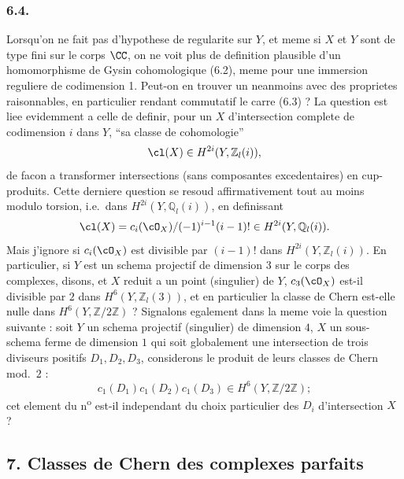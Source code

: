 \subsubsection*{6.4.}
Lorsqu'on ne fait pas d'hypothese de regularite sur $Y$, et meme si $X$ et $Y$ sont de type fini sur le corps $\CC$, on ne voit plus de definition plausible d'un homomorphisme de Gysin cohomologique (6.2), meme pour une immersion reguliere de codimension 1. Peut-on en trouver un neanmoins avec des proprietes raisonnables, en particulier rendant commutatif le carre (6.3) ? La question est liee evidemment a celle de definir, pour un $X$ d'intersection complete de codimension $i$ dans $Y$, ``sa classe de cohomologie''
\[
\cl(X) \in H^{2i}(Y, \mathbb{Z}_l(i)),
\]
de facon a transformer intersections (sans composantes excedentaires) en cup-produits. Cette derniere question se resoud affirmativement tout au moins modulo torsion, i.e.\ dans $H^{2i}(Y, \mathbb{Q}_l(i))$, en definissant
\[
\cl(X) = c_i(\cO_X) / (-1)^{i-1}(i-1)! \in H^{2i}(Y, \mathbb{Q}_l(i)).
\]
Mais j'ignore si $c_i(\cO_X)$ est divisible par $(i-1)!$ dans $H^{2i}(Y, \mathbb{Z}_l(i))$. En particulier, si $Y$ est un schema projectif de dimension $3$ sur le corps des complexes, disons, et $X$ reduit a un point (singulier) de $Y$, $c_3(\cO_X)$ est-il divisible par $2$ dans $H^{6}(Y, \mathbb{Z}_l(3))$, et en particulier la classe de Chern est-elle nulle dans $H^{6}(Y, \mathbb{Z}/2\mathbb{Z})$ ? Signalons egalement dans la meme voie la question suivante : soit $Y$ un schema projectif (singulier) de dimension $4$, $X$ un sous-schema ferme de dimension $1$ qui soit globalement une intersection de trois diviseurs positifs $D_1, D_2, D_3$, considerons le produit de leurs classes de Chern mod.\ $2$ :
\[
c_1(D_1) c_1(D_2) c_1(D_3) \in H^{6}(Y, \mathbb{Z}/2\mathbb{Z});
\]
cet element du n\textsuperscript{o} est-il independant du choix particulier des $D_i$ d'intersection $X$ ?

\subsection*{7. Classes de Chern des complexes parfaits}

